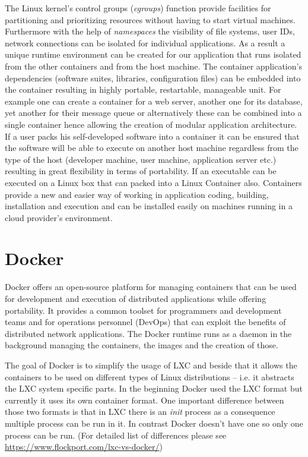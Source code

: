 \documentclass[a4paper]{article}
\begin{document}
The Linux kernel's control groups (\emph{cgroups}) function provide facilities for partitioning and prioritizing
resources without having to
start virtual machines. Furthermore with the help of \emph{namespaces} the visibility of file systems, user IDs,
network connections can be
isolated for individual applications. As a result a unique runtime environment can be created for our application that
runs isolated from
the other containers and from the host machine.
The container application's dependencies (software suites, libraries, configuration files) can be embedded into the
container resulting in
highly portable, restartable, manageable unit.
For example one can create a container for a web server, another one for its database, yet another for their message
queue or alternatively these
can be combined into a single container hence allowing the creation of modular application architecture.
If a user packs his self-developed software into a container it can be ensured that the software will be able to
execute on another host machine regardless from the type of the host (developer machine, user machine, application
server etc.) resulting in great flexibility in terms of portability.
If an executable can be executed on a Linux box that can packed into a Linux Container also. Containers provide a new
and easier way of working in application coding, building, installation and execution and can be installed easily on
machines running in a cloud provider's environment.

\section{Docker}

Docker offers an open-source platform for managing containers that can be used for development and execution of
distributed applications
while offering portability.
It provides a common toolset for programmers and development teams and for operations personnel (DevOps) that can
exploit the benefits
of distributed network applications.
The Docker runtime runs as a daemon in the background managing the containers, the images and the creation of those.

The goal of Docker is to simplify the usage of LXC and beside that it allows the containers to be used on different
types of Linux
distributions -- i.e. it abstracts the LXC system specific parts. In the beginning Docker used the LXC format but
currently it uses its own
container format. One important difference between those two formats is that in LXC there is an \emph{init} process as
a consequence multiple
process can be run in it. In contrast Docker doesn't have one so only one process can be run. (For detailed list of
differences please see \url{https://www.flockport.com/lxc-vs-docker/})
\end{document}

